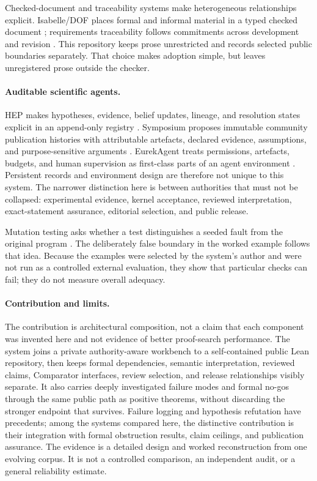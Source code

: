 \documentclass[10pt]{article}
\begin{document}
Checked-document and traceability systems make heterogeneous relationships
explicit. Isabelle/DOF places formal and informal material in a typed checked
document \cite{isadof}; requirements traceability follows commitments across
development and revision \cite{gotel}. This repository keeps prose unrestricted
and records selected public boundaries separately. That choice makes adoption
simple, but leaves unregistered prose outside the checker.

\paragraph{Auditable scientific agents.}
HEP makes hypotheses, evidence, belief updates, lineage, and resolution states
explicit in an append-only registry \cite{hep}. Symposium proposes immutable
community publication histories with attributable artefacts, declared
evidence, assumptions, and purpose-sensitive arguments \cite{symposium}.
EurekAgent treats permissions, artefacts, budgets, and human supervision as
first-class parts of an agent environment \cite{eurekagent}. Persistent records
and environment design are therefore not unique to this system. The narrower
distinction here is between authorities that must not be collapsed:
experimental evidence, kernel acceptance, reviewed interpretation,
exact-statement assurance, editorial selection, and public release.

Mutation testing asks whether a test distinguishes a seeded fault from the
original program \cite{demillo,jiaharman}. The deliberately false boundary in
the worked example follows that idea. Because the examples were selected by
the system's author and were not run as a controlled external evaluation, they
show that particular checks can fail; they do not measure overall adequacy.

\paragraph{Contribution and limits.}
The contribution is architectural composition, not a claim that each component
was invented here and not evidence of better proof-search performance. The
system joins a private authority-aware workbench to a self-contained public
Lean repository, then keeps formal dependencies, semantic interpretation,
reviewed claims, Comparator interfaces, review selection, and release
relationships visibly separate. It also carries deeply investigated failure
modes and formal no-gos through the same public path as positive theorems,
without discarding the stronger endpoint that survives. Failure logging and
hypothesis refutation have precedents; among the systems compared here, the
distinctive contribution is their integration with formal obstruction results,
claim ceilings, and publication assurance. The evidence is a detailed design
and worked reconstruction from one evolving corpus. It is not a controlled
comparison, an independent audit, or a general reliability estimate.
\end{document}
